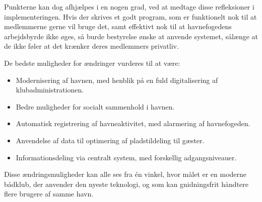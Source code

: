 Punkterne kan dog afhjælpes i en nogen grad, ved at medtage disse refleksioner i implementeringen. Hvis der skrives et godt program, som er funktionelt nok til at medlemmerne gerne vil bruge det, samt effektivt nok til at havnefogedens arbejdsbyrde ikke øges, så burde bestyrelse ønske at anvende systemet, sålænge at de ikke føler at det krænker deres medlemmers privatliv.

De bedste muligheder for ændringer vurderes til at være:

\begin{itemize}
  \item Modernisering af havnen, med henblik på en fuld digitalisering af klubadministrationen.
  \item Bedre muligheder for socialt sammenhold i havnen.
  \item Automatisk registrering af havneaktivitet, med alarmering af havnefogeden.
  \item Anvendelse af data til optimering af pladstildeling til gæster.
  \item Informationsdeling via centralt system, med forskellig adgangsniveauer.
\end{itemize}

Disse ændringsmuligheder kan alle ses fra én vinkel, hvor målet er en moderne bådklub, der anvender den nyeste teknologi, og som kan gnidningsfrit håndtere flere brugere af samme havn.
